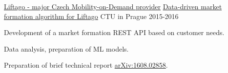 \begin{cventries}
  \cventry
    {\href{https://www.liftago.com/}{Liftago - major Czech Mobility-on-Demand provider}} %
    {\href{https://cw.fel.cvut.cz/b221/courses/b4b33rph/start}{Data-driven market formation algorithm for Liftago}} %
    {CTU in Prague} %
    {2015-2016} %
    {
      \begin{cvitems} %
        \item {Development of a market formation REST API based on customer needs.}
        \item {Data analysis, preparation of ML models.}
        \item {Preparation of brief technical report \href{https://arxiv.org/abs/1608.02858}{arXiv:1608.02858}.}
      \end{cvitems}
    }

\end{cventries}
    




